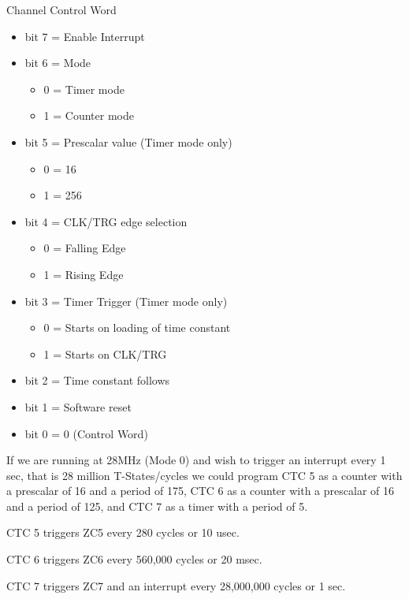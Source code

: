Channel Control Word
\begin{itemize}
\item[] bit 7 = Enable Interrupt
\item[] bit 6 = Mode
  \begin{itemize}
  \item 0 = Timer mode
  \item 1 = Counter mode
  \end{itemize}
\item[] bit 5 = Prescalar value (Timer mode only)
  \begin{itemize}
  \item 0 = 16
  \item 1 = 256
  \end{itemize}
\item[] bit 4 = CLK/TRG edge selection
  \begin{itemize}
  \item 0 = Falling Edge
  \item 1 = Rising Edge
  \end{itemize}
\item[] bit 3 = Timer Trigger (Timer mode only)
  \begin{itemize}
  \item 0 = Starts on loading of time constant
  \item 1 = Starts on CLK/TRG
  \end{itemize}
\item[] bit 2 = Time constant follows
\item[] bit 1 = Software reset
\item[] bit 0 = 0 (Control Word)
\end{itemize}

If we are running at 28MHz (Mode 0) and wish to trigger an interrupt
every 1 sec, that is 28 million T-States/cycles we could program CTC 5
as a counter with a prescalar of 16 and a period of 175, CTC 6 as a
counter with a prescalar of 16 and a period of 125, and CTC 7 as a
timer with a period of 5.

CTC 5 triggers ZC5 every 280 cycles or 10 usec.

CTC 6 triggers ZC6 every 560,000 cycles or 20 msec.

CTC 7 triggers ZC7 and an interrupt every 28,000,000 cycles or 1 sec.


